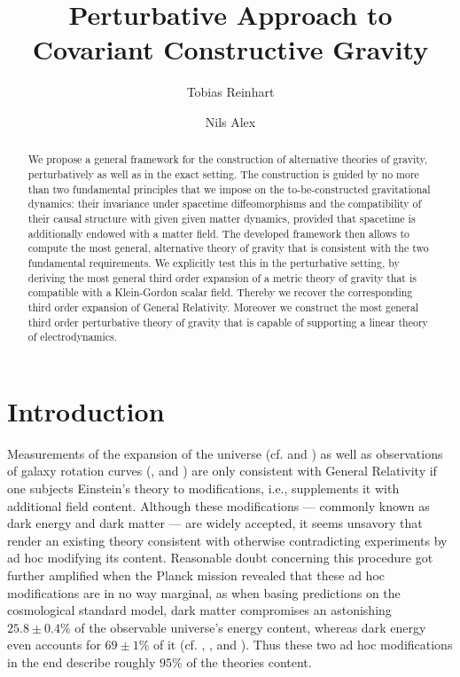 \documentclass[%
 reprint,
nofootinbib,
 amsmath,amssymb,
 aps,
 prd,
floatfix,
]{revtex4-2}
\begin{document}

\title{Perturbative Approach to Covariant Constructive Gravity}

\author{Tobias Reinhart}
\author{Nils Alex}


\begin{abstract}
We propose a general framework for the construction of alternative theories of gravity, perturbatively as well as in the exact setting. The construction is guided by no more than two fundamental principles that we impose on the to-be-constructed gravitational dynamics: their invariance under spacetime diffeomorphisms and the compatibility of their causal structure with given given matter dynamics, provided that spacetime is additionally endowed with a matter field. The developed framework then allows to compute the most general, alternative theory of gravity that is consistent with the two fundamental requirements. We explicitly test this in the perturbative setting, by deriving the most general third order expansion of a metric theory of gravity that is compatible with a Klein-Gordon scalar field. Thereby we recover the corresponding third order expansion of General Relativity. Moreover we construct the most general third order perturbative theory of gravity that is capable of supporting a linear theory of electrodynamics.
\end{abstract}

\maketitle

\section{Introduction}
Measurements of the expansion of the universe (cf. \cite{1999ApJ...517..565P} and \cite{1998AJ....116.1009R}) as well as observations of galaxy rotation curves (\cite{1970ApJ...160..811F}, \cite{1970ApJ...159..379R} and \cite{1980ApJ...238..471R}) are only consistent with General Relativity if one subjects Einstein's theory to modifications, i.e., supplements it with additional field content. Although these modifications --- commonly known as dark energy and dark matter --- are widely accepted, it seems unsavory that render an existing theory consistent with otherwise contradicting experiments by ad hoc modifying its content. Reasonable doubt concerning this procedure got further amplified when the Planck mission revealed that these ad hoc modifications are in no way marginal, as when basing predictions on the cosmological standard model, dark matter compromises an astonishing $ 25.8\pm0.4\%$ of the observable universe's energy content, whereas dark energy even accounts for $ 69 \pm 1 \%$ of it (cf. \cite{Planck13_1}, \cite{Planck13_2}, \cite{Planck15} and \cite{Planck18}). Thus these two ad hoc modifications in the end describe roughly $95\%$ of the theories content. 
\end{document}
